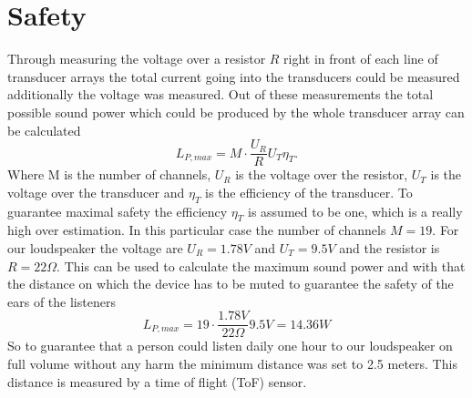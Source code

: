\section{Safety}
Through measuring the voltage over a resistor $R$ right in front of each line of transducer arrays the total current going into the transducers could be measured additionally the voltage was measured. Out of these measurements the total possible sound power which could be produced by the whole transducer array can be calculated
\begin{equation}
    L_{P,max} = M \cdot \frac{U_R}{R} U_{T}\eta_{T}.
\end{equation}
Where M is the number of channels, $U_R$ is the voltage over the resistor, $U_T$ is the voltage over the transducer and $\eta_{T}$ is the efficiency of the transducer. To guarantee maximal safety the efficiency $\eta_{T}$ is assumed to be one, which is a really high over estimation.
In this particular case the number of channels $M = 19$. For our loudspeaker the voltage are $U_R = 1.78 V$ and $U_T = 9.5 V $ and the resistor is $R = 22 \Omega$. This can be used to calculate the maximum sound power and with that the distance on which the device has to be muted to guarantee the safety of the ears of the listeners
\begin{equation}
     L_{P,max} = 19 \cdot \frac{1.78 V}{22 \Omega} 9.5 V = 14.36 W
\end{equation}
So to guarantee that a person could listen daily one hour to our loudspeaker on full volume without any harm the minimum distance was set to 2.5 meters. This distance is measured by a time of flight (ToF) sensor.    
\newpage